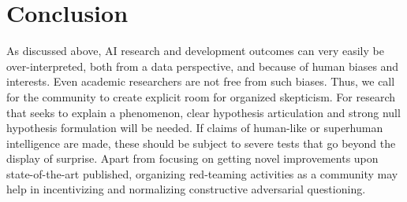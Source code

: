 \documentclass{article}
\theoremstyle{plain}
\theoremstyle{definition}
\theoremstyle{remark}
\begin{document}

\section{Conclusion}
As discussed above, AI research and development outcomes can very easily be over-interpreted, both from a data perspective, and because of human biases and interests. Even academic researchers are not free from such biases. Thus, we call for the community to create explicit room for organized skepticism. For research that seeks to explain a phenomenon, clear hypothesis articulation and strong null hypothesis formulation will be needed. If claims of human-like or superhuman intelligence are made, these should be subject to severe tests \cite{claesen2022severity} that go beyond the display of surprise. Apart from focusing on getting novel improvements upon state-of-the-art published, organizing red-teaming activities as a community may help in incentivizing and normalizing constructive adversarial questioning.
\end{document}
